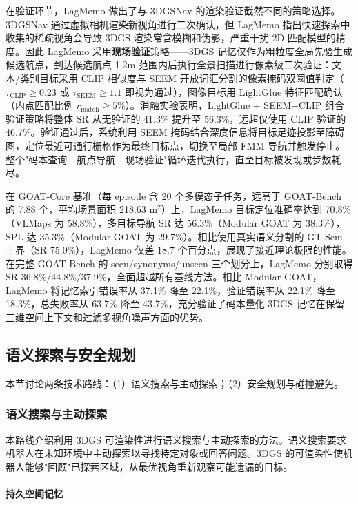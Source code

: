 在验证环节，LagMemo 做出了与 3DGSNav 的渲染验证截然不同的策略选择。3DGSNav 通过虚拟相机渲染新视角进行二次确认，但 LagMemo 指出快速探索中收集的稀疏视角会导致 3DGS 渲染常含模糊和伪影，严重干扰 2D 匹配模型的精度。因此 LagMemo 采用\textbf{现场验证}策略——3DGS 记忆仅作为粗粒度全局先验生成候选航点，到达候选航点 1.2m 范围内后执行全景扫描进行像素级二次验证：文本/类别目标采用 CLIP 相似度与 SEEM 开放词汇分割的像素掩码双阈值判定（$\tau_{\text{CLIP}} \geq 0.23$ 或 $\tau_{\text{SEEM}} \geq 1.1$ 即视为通过），图像目标用 LightGlue 特征匹配确认（内点匹配比例 $r_{\text{match}} \geq 5\%$）。消融实验表明，LightGlue + SEEM+CLIP 组合验证策略将整体 SR 从无验证的 41.3\% 提升至 56.3\%，远超仅使用 CLIP 验证的 46.7\%。验证通过后，系统利用 SEEM 掩码结合深度信息将目标足迹投影至障碍图，定位最近可通行栅格作为最终目标点，切换至局部 FMM 导航并触发停止。整个"码本查询—航点导航—现场验证"循环迭代执行，直至目标被发现或步数耗尽。

在 GOAT-Core 基准（每 episode 含 20 个多模态子任务，远高于 GOAT-Bench 的 7.88 个，平均场景面积 218.63 $\text{m}^2$）上，LagMemo 目标定位准确率达到 70.8\%（VLMaps 为 58.8\%），多目标导航 SR 达 56.3\%（Modular GOAT 为 38.3\%），SPL 达 35.3\%（Modular GOAT 为 29.7\%）。相比使用真实语义分割的 GT-Sem 上界（SR 75.0\%），LagMemo 仅差 18.7 个百分点，展现了接近理论极限的性能。在完整 GOAT-Bench 的 seen/synonyms/unseen 三个划分上，LagMemo 分别取得 SR 36.8\%/44.8\%/37.9\%，全面超越所有基线方法。相比 Modular GOAT，LagMemo 将记忆索引错误率从 37.1\% 降至 22.1\%，验证错误率从 22.1\% 降至 18.3\%，总失败率从 63.7\% 降至 43.7\%，充分验证了码本量化 3DGS 记忆在保留三维空间上下文和过滤多视角噪声方面的优势。

\subsection{语义探索与安全规划}
\label{ss:17_1b}

本节讨论两条技术路线：（1）语义搜索与主动探索；（2）安全规划与碰撞避免。

\subsubsection{语义搜索与主动探索}

本路线介绍利用 3DGS 可渲染性进行语义搜索与主动探索的方法。语义搜索要求机器人在未知环境中主动探索以寻找特定对象或回答问题。3DGS 的可渲染性使机器人能够"回顾"已探索区域，从最优视角重新观察可能遗漏的目标。

\paragraph{持久空间记忆}

